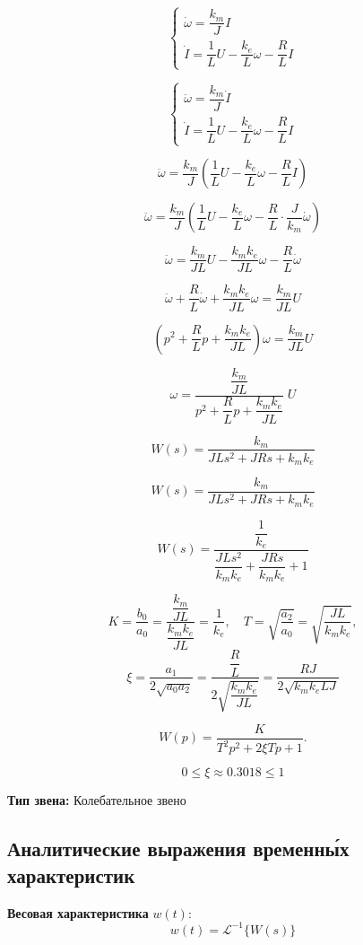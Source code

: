 \documentclass[a5paper, 10pt]{article}
\theoremstyle{definition}
\theoremstyle{plain}
\theoremstyle{remark}
\begin{document}
\[
\begin{cases} 
\dot{\omega} = \dfrac{k_m}{J}I \\ 
\dot{I} = \dfrac{1}{L}U - \dfrac{k_e}{L}\omega - \dfrac{R}{L}I 
\end{cases}
\]


\[
\begin{cases} 
\ddot{\omega} = \dfrac{k_m}{J}\dot{I} \\ 
\dot{I} = \dfrac{1}{L}U - \dfrac{k_e}{L}\omega - \dfrac{R}{L}I 
\end{cases}
\]


\[
\ddot{\omega} = \dfrac{k_m}{J}\left(\dfrac{1}{L}U - \dfrac{k_e}{L}\omega - \dfrac{R}{L}I\right)
\]



\[
\ddot{\omega} = \dfrac{k_m}{J}\left(\dfrac{1}{L}U - \dfrac{k_e}{L}\omega - \dfrac{R}{L}\cdot \dfrac{J}{k_m}\dot{\omega}\right)
\]

\[
\ddot{\omega} = \dfrac{k_m}{JL}U - \dfrac{k_m k_e}{JL}\omega - \dfrac{R}{L}\dot{\omega}
\]

\[
\ddot{\omega} + \dfrac{R}{L}\dot{\omega} + \dfrac{k_m k_e}{JL}\omega = \dfrac{k_m}{JL}U
\]


\[
\left(p^2 + \dfrac{R}{L}p + \dfrac{k_m k_e}{JL}\right)\omega = \dfrac{k_m}{JL}U
\]

\[
\omega = \frac{\dfrac{k_m}{JL}}{p^2 + \dfrac{R}{L}p + \dfrac{k_m k_e}{JL}} \; U
\]

\[
W(s) = \frac{k_m}{JLs^2 + JRs + k_m k_e}
\]

\[
W(s) = \dfrac{k_m}{JLs^2 + JRs + k_m k_e}
\]

\[
W(s) = \dfrac{\dfrac{1}{k_e}}{\dfrac{JLs^2}{k_m k_e} + \dfrac{JRs}{k_m k_e} + 1}
\]

\[
K=\dfrac{b_0}{a_0}=\dfrac{\dfrac{k_m}{JL}}{\dfrac{k_mk_e}{JL}}=\dfrac{1}{k_e}, \quad T=\sqrt{\dfrac{a_2}{a_0}}=\sqrt{\dfrac{JL}{k_mk_e}},\]
\[
\xi=\dfrac{a_1}{2\sqrt{a_0a_2}}=\dfrac{\dfrac{R}{L}}{2\sqrt{\dfrac{k_mk_e}{JL}}}=\dfrac{RJ}{2\sqrt{k_mk_eLJ}}
\]

$$
W(p) = \frac{K}{T^2 p^2 + 2 \xi T p + 1}.
$$

$$0\leq\xi\approx0.3018\leq1$$

\textbf{Тип звена:} Колебательное звено


\subsection{Аналитические выражения временны́х характеристик}


\textbf{Весовая характеристика} $w(t)$:
$$w(t)=\mathcal{L}^{-1}\{ W(s)\}$$
\end{document}
